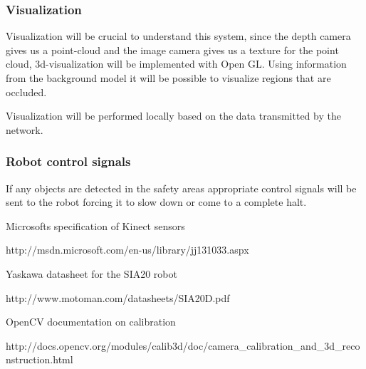 \documentclass[10pt,a4paper,twocolumn,english]{article}
\begin{document}
\subsubsection{Visualization}

Visualization will be crucial to understand this system, since the depth camera gives us a point-cloud and the image camera gives us a texture for the point cloud, 3d-visualization will be implemented with Open GL. Using information from the background model it will be possible to visualize regions that are occluded.

Visualization will be performed locally based on the data transmitted by the network.

\subsubsection{Robot control signals}

If any objects are detected in the safety areas appropriate control signals will be sent to the robot forcing it to slow down or come to a complete halt.

\clearpage

\begin{thebibliography}{9}

Microsofts specification of Kinect sensors

http://msdn.microsoft.com/en-us/library/jj131033.aspx

Yaskawa datasheet for the SIA20 robot

http://www.motoman.com/datasheets/SIA20D.pdf

OpenCV documentation on calibration

http://docs.opencv.org/modules/calib3d/doc/camera\_calibration\_and\_3d\_reconstruction.html


\end{thebibliography}
\end{document}
